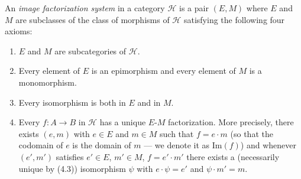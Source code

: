 An \textit{image factorization system} in a category $\mathcal{H}$ is a pair $(E, M)$ where $E$ and $M$ are subclasses of the class of morphisms of $\mathcal{H}$ satisfying the following four axioms:

\begin{enumerate}
\item[(4.2)] $E$ and $M$ are subcategories of $\mathcal{H}$.
\item[(4.3)] Every element of $E$ is an epimorphism and every element of $M$ is a monomorphism.
\item[(4.4)] Every isomorphism is both in $E$ and in $M$.
\item[(4.5)] Every $f: A \longrightarrow B$ in $\mathcal{H}$ has a unique $E$-$M$ factorization. More precisely, there exists $(e, m)$ with $e \in E$ and $m \in M$ such that $f = e \cdot m$ (so that the codomain of $e$ is the domain of $m$ — we denote it as $\mathrm{Im}(f)$) and whenever $(e', m')$ satisfies $e' \in E$, $m' \in M$, $f = e' \cdot m'$ there exists a (necessarily unique by (4.3)) isomorphism $\psi$ with $e \cdot \psi = e'$ and $\psi \cdot m' = m$.
\end{enumerate}
